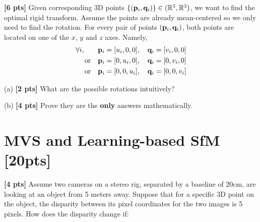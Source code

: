 \begin{questions}
    \begin{tcolorbox}[fit,height fill, width=\textwidth, blank, borderline={0.5pt}{-2pt},halign=left, valign=center, nobeforeafter]


    \end{tcolorbox}

    \question \textbf{[6 pts]} Given corresponding 3D points $\{(\mathbf{p}_i, \mathbf{q}_i)\} \in (\mathbb{R}^3, \mathbb{R}^3)$, we want to find the optimal rigid transform. Assume the points are already mean-centered so we only need to find the rotation. For every pair of points $(\mathbf{p}_i, \mathbf{q}_i)$, both points are located on one of the $x$, $y$ and $z$ axes. Namely,
    \begin{align*}
        \forall i, \qquad & \mathbf{p}_i = [u_i, 0, 0], \quad \mathbf{q}_i = [v_i, 0, 0] \\
        \text{or} \quad   & \mathbf{p}_i = [0, u_i, 0], \quad \mathbf{q}_i = [0, v_i, 0] \\
        \text{or} \quad   & \mathbf{p}_i = [0, 0, u_i], \quad \mathbf{q}_i = [0, 0, v_i] \\
    \end{align*}

    (a) \textbf{[2 pts]}  What are the possible rotations intuitively?

    \begin{tcolorbox}[fit,height=7cm, width=\textwidth, blank, borderline={0.5pt}{-2pt},halign=left, valign=center, nobeforeafter]


    \end{tcolorbox}

    (b) \textbf{[4 pts]} Prove they are the \textbf{only} answers mathematically.

    \begin{tcolorbox}[fit,height fill, width=\textwidth, blank, borderline={0.5pt}{-2pt},halign=left, valign=center, nobeforeafter]

    \end{tcolorbox}


    \section{MVS and Learning-based SfM [20pts]}

    \question \textbf{[4 pts]} Assume two cameras on a stereo rig, separated by a baseline of 20cm, are looking at an object from 5 meters away. Suppose that for a specific 3D point on the object, the disparity between its pixel coordinates for the two images is 5 pixels. How does the disparity change if:


\end{questions}
